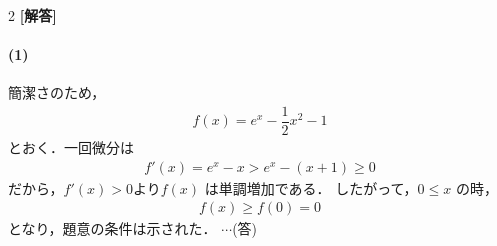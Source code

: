 \documentclass[../../main.tex]{subfiles}
\begin{document}
\setcounter{equation}{0}
\begin{oframed}
  
\end{oframed}
\setlength{\columnseprule}{0.4pt}
\begin{multicols}{2}
  {\bf [解答]}

  \paragraph{(1)}
  簡潔さのため，
  \begin{align}
    f(x) = e^x - \dfrac{1}{2}x^2-1
  \end{align}
  とおく．一回微分は
  \begin{align}
    f'(x) = e^x - x > e^x - (x+1) \geq 0
  \end{align}
  だから，$f'(x)>0$より$f(x)$ は単調増加である．
  したがって，$0 \leq x$ の時，
  \begin{align}
    f(x) \geq f(0) = 0
  \end{align}
  となり，題意の条件は示された．  $\cdots$(答)


\end{multicols}
\end{document}

